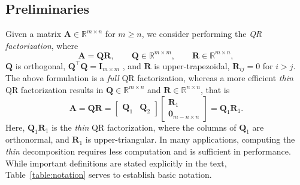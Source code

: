 \documentclass[review,onefignum,onetabnum]{siamart190516}
\newcommand{\R}{\mathbb{R}}
\newcommand{\bb}[1]{\mathbf{#1}}
\begin{document}
\subsection{Preliminaries}

Given a matrix $\bb{A} \in \R^{m \times n}$ for $m\geq n$, we consider performing the {\it QR factorization}, 
where
$$\bb{A} = \bb{QR},
\qquad
\bb{Q} \in \R^{m \times m},
\qquad
\bb{R} \in \R^{m \times n},$$
$\bb{Q}$ is orthogonal, $\bb{Q}^\top \bb{Q} = \bb{I}_{m\times m}$ , and $\bb{R}$ is upper-trapezoidal, $\bb{R}_{ij} = 0$ for $i>j$.
The above formulation is a \emph{full} QR factorization, whereas a more efficient \emph{thin} QR factorization results in $\bb{Q}\in\R^{m\times n}$ and $\bb{R}\in\R^{n\times n}$, that is
\[
\bb{A} = \bb{QR} = \begin{bmatrix}\bb{Q}_1 & \bb{Q}_2\end{bmatrix} \begin{bmatrix}\bb{R}_1 \\ \bb{0}_{m-n \times n}\end{bmatrix} = \bb{Q}_1\bb{R}_1.
\]
Here, $\bb{Q}_1\bb{R}_1$ is the \emph{thin} QR factorization, where the columns of $\bb{Q}_1$ are orthonormal, and $\bb{R}_1$ is upper-triangular.
In many applications, computing the \emph{thin} decomposition requires less computation and is sufficient in performance. 
While important definitions are stated explicitly in the text, Table~\ref{table:notation} serves to establish basic notation.
\end{document}

